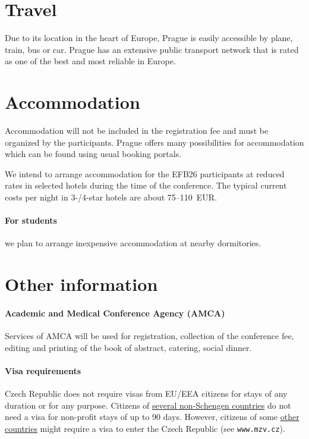 \documentclass[12pt]{extarticle}
\begin{document}
\section*{Travel}
\noindent
Due to its location in the heart of Europe, Prague is easily
accessible by plane, train, bus or car. Prague has an extensive public
transport network that is rated as one of the best and most reliable
in Europe.

\section*{Accommodation}
\noindent
Accommodation will not be included in the registration fee and must be
organized by the participants. Prague offers many possibilities for
accommodation which can be found using usual booking portals.

We intend to arrange accommodation for the EFB26 participants at
reduced rates in selected hotels during the time of the conference.
The typical current costs per night in 3-{}/4-star hotels are about
75--110~EUR.

\paragraph{For students} we plan to arrange inexpensive accommodation
at nearby dormitories.

\section*{Other information}

\paragraph{Academic and Medical Conference Agency (AMCA)}
Services of AMCA will be used for registration, collection of the
conference fee, editing and printing of the book of abstract,
catering, social dinner.

\paragraph{Visa requirements}
Czech Republic does not require visas from EU/EEA citizens for stays
of any duration or for any purpose. Citizens of
\href{https://www.mzv.cz/jnp/en/information_for_aliens/short_stay_visa/list_of_states_whose_citizens_are_exempt/index.html}{several
  non-Schengen countries} do not need a visa for non-profit stays of
up to 90 days. However, citizens of some
\href{https://www.mzv.cz/jnp/en/information_for_aliens/short_stay_visa/list_of_states_whose_citizens_are/index.html}{other
  countries} might require a visa to enter the Czech Republic (see
\texttt{www.mzv.cz}).
\end{document}
